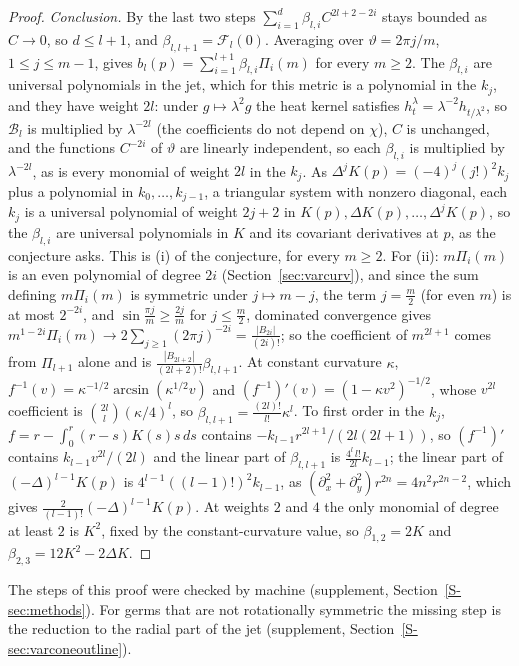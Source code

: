 \documentclass[pdflatex,sn-mathphys-num]{sn-jnl}
\theoremstyle{thmstyleone}%
\theoremstyle{thmstylethree}%
\newcommand{\sref}[1]{\ref*{S-#1}}%
\begin{document}
\begin{proof}
\emph{Conclusion.} By the last two steps $\sum_{i=1}^d\beta_{l,i}C^{2l+2-2i}$ stays bounded as $C\to0$, so $d\le l+1$, and $\beta_{l,l+1}=\mathcal F_l(0)$. Averaging over $\vartheta=2\pi j/m$, $1\le j\le m-1$, gives $b_l(p)=\sum_{i=1}^{l+1}\beta_{l,i}\Pi_i(m)$ for every $m\ge2$. The $\beta_{l,i}$ are universal polynomials in the jet, which for this metric is a polynomial in the $k_j$, and they have weight $2l$: under $g\mapsto\lambda^2g$ the heat kernel satisfies $h^{\lambda}_t=\lambda^{-2}h_{t/\lambda^2}$, so $\mathcal B_l$ is multiplied by $\lambda^{-2l}$ (the coefficients do not depend on $\chi$), $C$ is unchanged, and the functions $C^{-2i}$ of $\vartheta$ are linearly independent, so each $\beta_{l,i}$ is multiplied by $\lambda^{-2l}$, as is every monomial of weight $2l$ in the $k_j$. As $\Delta^jK(p)=(-4)^j(j!)^2k_j$ plus a polynomial in $k_0,\dots,k_{j-1}$, a triangular system with nonzero diagonal, each $k_j$ is a universal polynomial of weight $2j+2$ in $K(p),\Delta K(p),\dots,\Delta^jK(p)$, so the $\beta_{l,i}$ are universal polynomials in $K$ and its covariant derivatives at $p$, as the conjecture asks. This is (i) of the conjecture, for every $m\ge2$. For (ii): $m\Pi_i(m)$ is an even polynomial of degree $2i$ (Section~\ref{sec:varcurv}), and since the sum defining $m\Pi_i(m)$ is symmetric under $j\mapsto m-j$, the term $j=\frac m2$ (for even $m$) is at most $2^{-2i}$, and $\sin\frac{\pi j}m\ge\frac{2j}m$ for $j\le\frac m2$, dominated convergence gives $m^{1-2i}\Pi_i(m)\to2\sum_{j\ge1}(2\pi j)^{-2i}=\frac{|B_{2i}|}{(2i)!}$; so the coefficient of $m^{2l+1}$ comes from $\Pi_{l+1}$ alone and is $\frac{|B_{2l+2}|}{(2l+2)!}\beta_{l,l+1}$. At constant curvature $\kappa$, $f^{-1}(v)=\kappa^{-1/2}\arcsin(\kappa^{1/2}v)$ and $(f^{-1})'(v)=(1-\kappa v^2)^{-1/2}$, whose $v^{2l}$ coefficient is $\binom{2l}l(\kappa/4)^l$, so $\beta_{l,l+1}=\frac{(2l)!}{l!}\kappa^l$. To first order in the $k_j$, $f=r-\int_0^r(r-s)K(s)s\,ds$ contains $-k_{l-1}r^{2l+1}/(2l(2l+1))$, so $(f^{-1})'$ contains $k_{l-1}v^{2l}/(2l)$ and the linear part of $\beta_{l,l+1}$ is $\frac{4^l\,l!}{2l}k_{l-1}$; the linear part of $(-\Delta)^{l-1}K(p)$ is $4^{l-1}((l-1)!)^2k_{l-1}$, as $(\partial_x^2+\partial_y^2)r^{2n}=4n^2r^{2n-2}$, which gives $\frac2{(l-1)!}(-\Delta)^{l-1}K(p)$. At weights $2$ and $4$ the only monomial of degree at least $2$ is $K^2$, fixed by the constant-curvature value, so $\beta_{1,2}=2K$ and $\beta_{2,3}=12K^2-2\Delta K$.
\end{proof}

The steps of this proof were checked by machine (supplement, Section~\sref{sec:methods}). For germs that are not rotationally symmetric the missing step is the reduction to the radial part of the jet (supplement, Section~\sref{sec:varconeoutline}).
\end{document}
